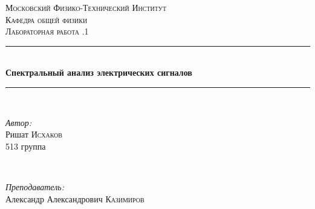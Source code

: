 \documentclass[a4paper, 12pt]{article}
\begin{document}
\begin{titlepage}

\newcommand{\HRule}{\rule{\linewidth}{0.5mm}} %

\center %
 

\textsc{\LARGE Московский Физико-Технический Институт}\\[1,5cm] %
\textsc{\Large Кафедра общей физики}\\[0.5cm] %
\textsc{\large Лабораторная работа .1}\\[0.5cm] %


\HRule
\\[0.4cm]
{ \huge \bfseries Спектральный анализ электрических сигналов}
\\[0.2cm] %
\HRule
\\[1.5cm]


 

\begin{minipage}{0.4\textwidth}
	\begin{flushleft} \large
		\emph{Автор:}\\
		Ришат \textsc{Исхаков} \\
		513 группа
	\end{flushleft}
\end{minipage}
~
\begin{minipage}{0.4\textwidth}
	\begin{flushright} \large
		\emph{Преподаватель:} \\
		Александр Александрович \textsc{Казимиров} %
	\end{flushright}
\end{minipage}


\end{titlepage}
\end{document}
